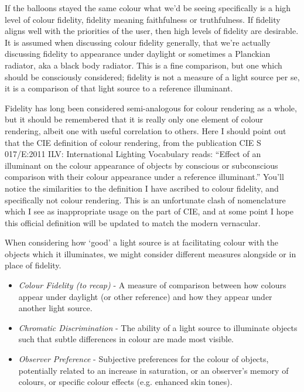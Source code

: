 If the balloons stayed the same colour what we'd be seeing specifically is a high level of colour fidelity, fidelity meaning faithfulness or truthfulness. If fidelity aligns well with the priorities of the user, then high levels of fidelity are desirable. It is assumed when discussing colour fidelity generally, that we're actually discussing fidelity to appearance under daylight or sometimes a Planckian radiator, aka a black body radiator. This is a fine comparison, but one which should be consciously considered; fidelity is not a measure of a light source per se, it is a comparison of that light source to a reference illuminant.

Fidelity has long been considered semi-analogous for colour rendering as a whole, but it should be remembered that it is really only one element of colour rendering, albeit one with useful correlation to others. Here I should point out that the CIE definition of colour rendering, from the publication CIE S 017/E:2011 ILV: International Lighting Vocabulary \citep{cie_cie_2011} reads: ``Effect of an illuminant on the colour appearance of objects by conscious or subconscious comparison with their colour appearance under a reference illuminant.'' You'll notice the similarities to the definition I have ascribed to colour fidelity, and specifically not colour rendering. This is an unfortunate clash of nomenclature which I see as inappropriate usage on the part of CIE, and at some point I hope this official definition will be updated to match the modern vernacular.

When considering how `good' a light source is at facilitating colour with the objects which it illuminates, we might consider different measures alongside or in place of fidelity.

\begin{itemize}
\item \emph{Colour Fidelity (to recap)} - A measure of comparison between how colours appear under daylight (or other reference) and how they appear under another light source. %
\item \emph{Chromatic Discrimination} - The ability of a light source to illuminate objects such that subtle differences in colour are made most visible. %
\item \emph{Observer Preference} - Subjective preferences for the colour of objects, potentially related to an increase in saturation, or an observer's memory of colours, or specific colour effects (e.g. enhanced skin tones). %
\end{itemize}

